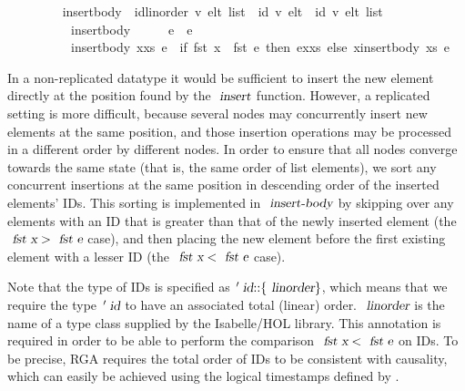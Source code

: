 \vspace{0.275em}
\begin{isabellebody}
\ \ \ \ \ \ \ \  insert{\isacharunderscore}body\ {\isacharcolon}{\isacharcolon}\ {\isachardoublequoteopen}{\isacharparenleft}{\isacharprime}id{\isacharcolon}{\isacharcolon}{\isacharbraceleft}linorder{\isacharbraceright}{\isacharcomma}\ {\isacharprime}v{\isacharparenright}\ elt\ list\ {\isasymRightarrow}\ {\isacharparenleft}{\isacharprime}id{\isacharcomma}\ {\isacharprime}v{\isacharparenright}\ elt\ {\isasymRightarrow}\ {\isacharparenleft}{\isacharprime}id{\isacharcomma}\ {\isacharprime}v{\isacharparenright}\ elt\ list{\isachardoublequoteclose}\ \isanewline
\ \ \ \ \ \ \ \ \ \ {\isachardoublequoteopen}insert{\isacharunderscore}body\ {\isacharbrackleft}{\isacharbrackright}\ \ \ \ \ e\ {\isacharequal}\ {\isacharbrackleft}e{\isacharbrackright}{\isachardoublequoteclose}\ {\isacharbar}\isanewline
\ \ \ \ \ \ \ \ \ \ {\isachardoublequoteopen}insert{\isacharunderscore}body\ {\isacharparenleft}x{\isacharhash}xs{\isacharparenright}\ e\ {\isacharequal}\ {\isacharparenleft}if\ fst\ x\ {\isacharless}\ fst\ e\ then\ e{\isacharhash}x{\isacharhash}xs\ else\ x{\isacharhash}insert{\isacharunderscore}body\ xs\ e{\isacharparenright}{\isachardoublequoteclose}
\end{isabellebody}
\vspace{0.275em}

In a non-replicated datatype it would be sufficient to insert the new element directly at the position found by the $\isa{insert}$ function.
However, a replicated setting is more difficult, because several nodes may concurrently insert new elements at the same position, and those insertion operations may be processed in a different order by different nodes.
In order to ensure that all nodes converge towards the same state (that is, the same order of list elements), we sort any concurrent insertions at the same position in descending order of the inserted elements' IDs.
This sorting is implemented in $\isa{insert-body}$ by skipping over any elements with an ID that is greater than that of the newly inserted element (the $\isa{fst x} > \isa{fst e}$ case), and then placing the new element before the first existing element with a lesser ID (the $\isa{fst x} < \isa{fst e}$ case).

Note that the type of IDs is specified as $\isacharprime\isa{id}\isacharcolon\isacharcolon\isacharbraceleft\isa{linorder}\isacharbraceright$, which means that we require the type $\isacharprime\isa{id}$ to have an associated total (linear) order.
$\isa{linorder}$ is the name of a type class supplied by the Isabelle/HOL library.
This annotation is required in order to be able to perform the comparison $\isa{fst x} < \isa{fst e}$ on IDs.
To be precise, RGA requires the total order of IDs to be consistent with causality, which can easily be achieved using the logical timestamps defined by \citet{Lamport:1978jq}.

